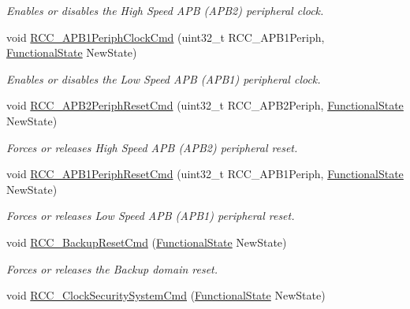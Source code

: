 \begin{DoxyCompactItemize}
\begin{DoxyCompactList}\small\item\em Enables or disables the High Speed A\+PB (A\+P\+B2) peripheral clock. \end{DoxyCompactList}\item 
void \mbox{\hyperlink{group___r_c_c___exported___functions_gaee7cc5d73af7fe1986fceff8afd3973e}{R\+C\+C\+\_\+\+A\+P\+B1\+Periph\+Clock\+Cmd}} (uint32\+\_\+t R\+C\+C\+\_\+\+A\+P\+B1\+Periph, \mbox{\hyperlink{group___exported__types_gac9a7e9a35d2513ec15c3b537aaa4fba1}{Functional\+State}} New\+State)
\begin{DoxyCompactList}\small\item\em Enables or disables the Low Speed A\+PB (A\+P\+B1) peripheral clock. \end{DoxyCompactList}\item 
void \mbox{\hyperlink{group___r_c_c___exported___functions_gad94553850ac07106a27ee85fec37efdf}{R\+C\+C\+\_\+\+A\+P\+B2\+Periph\+Reset\+Cmd}} (uint32\+\_\+t R\+C\+C\+\_\+\+A\+P\+B2\+Periph, \mbox{\hyperlink{group___exported__types_gac9a7e9a35d2513ec15c3b537aaa4fba1}{Functional\+State}} New\+State)
\begin{DoxyCompactList}\small\item\em Forces or releases High Speed A\+PB (A\+P\+B2) peripheral reset. \end{DoxyCompactList}\item 
void \mbox{\hyperlink{group___r_c_c___exported___functions_gab197ae4369c10b92640a733b40ed2801}{R\+C\+C\+\_\+\+A\+P\+B1\+Periph\+Reset\+Cmd}} (uint32\+\_\+t R\+C\+C\+\_\+\+A\+P\+B1\+Periph, \mbox{\hyperlink{group___exported__types_gac9a7e9a35d2513ec15c3b537aaa4fba1}{Functional\+State}} New\+State)
\begin{DoxyCompactList}\small\item\em Forces or releases Low Speed A\+PB (A\+P\+B1) peripheral reset. \end{DoxyCompactList}\item 
void \mbox{\hyperlink{group___r_c_c___exported___functions_ga636c3b72f35391e67f12a551b15fa54a}{R\+C\+C\+\_\+\+Backup\+Reset\+Cmd}} (\mbox{\hyperlink{group___exported__types_gac9a7e9a35d2513ec15c3b537aaa4fba1}{Functional\+State}} New\+State)
\begin{DoxyCompactList}\small\item\em Forces or releases the Backup domain reset. \end{DoxyCompactList}\item 
void \mbox{\hyperlink{group___r_c_c___exported___functions_ga0ff1fd7b9a8a49cdda11b7d7261c3494}{R\+C\+C\+\_\+\+Clock\+Security\+System\+Cmd}} (\mbox{\hyperlink{group___exported__types_gac9a7e9a35d2513ec15c3b537aaa4fba1}{Functional\+State}} New\+State)

\end{DoxyCompactItemize}
